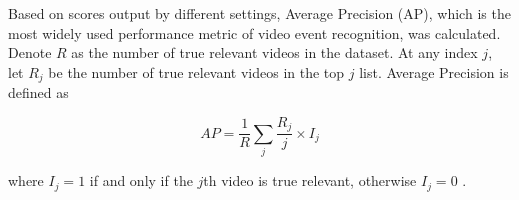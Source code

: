 \noindent Based on scores output by different settings, Average Precision (AP), which is the most widely used performance metric of video event recognition, was calculated. Denote $R$ as the number of true relevant videos in the dataset. At any index $j$, let $R_j$ be the number of true relevant videos in the top $j$ list. Average Precision is defined as

\begin{equation}
AP = \frac{1}{R} \sum_{j} \frac{R_j}{j} \times I_j 
\end{equation} 

\noindent where $I_j = 1$ if and only if the $j$th video is true relevant, otherwise $I_j = 0$ .  

\begin{table}[!ht]
  \begin{center}
    \end{center}
    \caption{Means and standard deviations (percent) of MAPs over six events at different levels using SVM with different kernels.}
\end{table}

